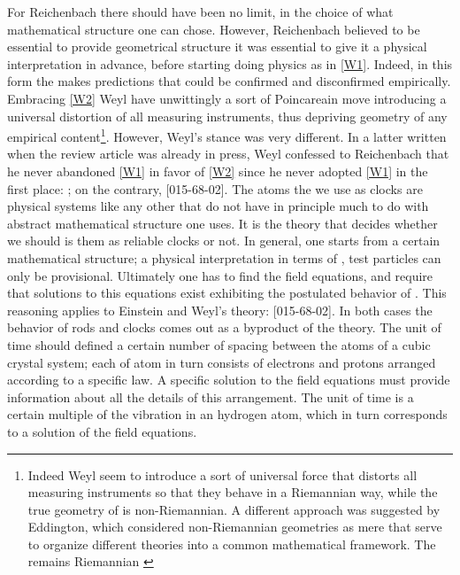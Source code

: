 \documentclass[draft]{article}
\begin{document}
For Reichenbach there should have been no limit, in the choice of what mathematical structure one can chose. However, Reichenbach believed to be essential to provide geometrical structure it was essential to give it a physical interpretation in advance, before starting doing physics as in \cref{W1}. Indeed, in this form the makes predictions that could be confirmed and disconfirmed empirically. Embracing \cref{W2} Weyl have unwittingly a sort of Poincareain move introducing a universal distortion of all measuring instruments, thus depriving geometry of any empirical content\footnote{Indeed Weyl seem to introduce a sort of universal force that distorts all measuring instruments so that they behave in a Riemannian way, while the true geometry of \spti is non-Riemannian. A different approach was suggested by Eddington, which considered non-Riemannian geometries as mere  that serve to organize different theories into a common mathematical framework. The  remains Riemannian \citep{Eddington1921}}. However, Weyl's stance was very different. In a latter written when the review article was already in press, Weyl confessed to Reichenbach that he never abandoned \cref{W1} in favor of \cref{W2} since he never adopted \cref{W1} in the first place: ; on the contrary,  [015-68-02]. The atoms the we use as clocks are physical systems like any other that do not have in principle much to do with abstract mathematical structure one uses. It is the theory that decides whether we should is them as reliable clocks or not. In general, one starts from a certain mathematical structure; a physical interpretation in terms of \rac, test particles can only be provisional. Ultimately one has to find the field equations, and require that solutions to this equations exist exhibiting the postulated behavior of \rac. This reasoning applies to Einstein and Weyl's theory:  [015-68-02]. In both cases the behavior of rods and clocks comes out as a byproduct of the theory. The unit of time should defined a certain number of spacing between the atoms of a cubic crystal system; each of atom in turn consists of electrons and protons arranged according to a specific law. A specific solution to the field equations must provide information about all the details of this arrangement.  The unit of time is a certain multiple of the vibration in an hydrogen atom, which in turn corresponds to a solution of the field equations. 
\end{document}
